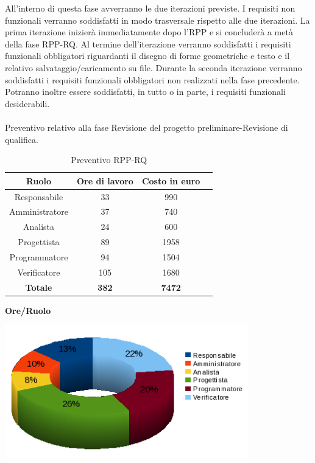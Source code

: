All'interno di questa fase avverranno le due iterazioni previste. I requisiti non funzionali verranno soddisfatti in modo trasversale rispetto alle due iterazioni. La prima iterazione inizier\`a immediatamente dopo l'RPP e si concluder\`a a met\`a della fase RPP-RQ. Al termine dell'iterazione verranno soddisfatti i requisiti funzionali obbligatori riguardanti il disegno di forme geometriche e testo e il relativo salvataggio/caricamento su file. Durante la seconda iterazione verranno soddisfatti i requisiti funzionali obbligatori non realizzati nella fase precedente. Potranno inoltre essere soddisfatti, in tutto o in parte, i requisiti funzionali desiderabili.
\\
\\
Preventivo relativo alla fase Revisione del progetto preliminare-Revisione di qualifica.
\begin{table}[h]
	\begin{center}
		  \begin{tabular}{|c|c|c|c|}
		 \hline 
		 \textbf{Ruolo} & \textbf{Ore di lavoro} & \textbf{Costo in euro}\\
		 \hline
		Responsabile & 33 & 990 \\
		Amministratore & 37 & 740\\
		Analista & 24 & 600\\
		Progettista & 89 & 1958\\
		Programmatore & 94 & 1504 \\
		Verificatore & 105 & 1680\\
        \hline
        \textbf{Totale} & \textbf{382} & \textbf{7472}\\
		\hline
		\end{tabular}
	\caption{Preventivo RPP-RQ} 
	\label{tab:tabella_RPP-RQ}
	\end{center}	
\end{table}

\newpage
\begin{center}\textbf{Ore/Ruolo}
\end{center}
\includegraphics[width=300pt]{RPP_RQ_Ore}

